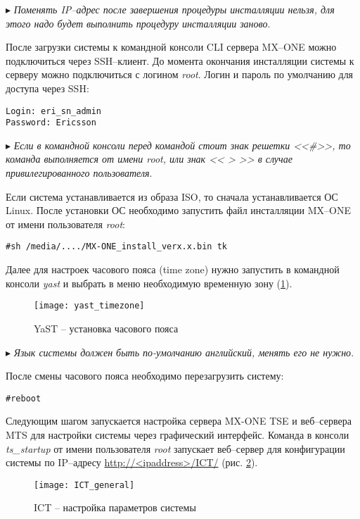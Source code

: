 $\blacktriangleright$ {\em Поменять IP--адрес после завершения процедуры инсталляции нельзя, для этого надо будет выполнить процедуру инсталляции заново}.

После загрузки системы к командной консоли CLI сервера MX--ONE можно подключиться через SSH--клиент. До момента окончания инсталляции системы к серверу можно подключиться с логином {\em root}. Логин и пароль по умолчанию для доступа через SSH:
\begin{lstlisting}
Login: eri_sn_admin
Password: Ericsson
\end{lstlisting}

$\blacktriangleright$ {\em Если в командной консоли перед командой стоит знак решетки <<\#>>, то команда выполняется от имени root, или знак << > >> в случае привилегированного пользователя}.

Если система устанавливается из образа ISO, то сначала устанавливается ОС Linux. После установки ОС необходимо запустить файл инсталляции MX--ONE от имени пользователя {\em root}:

\begin{lstlisting}
#sh /media/..../MX-ONE_install_verx.x.bin tk
\end{lstlisting}

Далее для настроек часового пояса (time zone) нужно запустить в командной консоли {\em yast} и выбрать в меню необходимую временную зону (\ref{img:yast_timezone}).
\begin{figure}[ht]
  \center
  \texttt{[image: yast\_timezone]}
  \caption{YaST -- установка часового пояса}
  \label{img:yast_timezone}
\end{figure}

$\blacktriangleright$ {\em Язык системы должен быть по-умолчанию английский, менять его не нужно}.

После смены часового пояса необходимо перезагрузить систему:
\begin{lstlisting}
#reboot
\end{lstlisting}
\clearpage

Следующим шагом запускается настройка сервера MX-ONE TSE и веб--сервера MTS для настройки системы через графический интерфейс.
Команда в консоли {\em ts\_startup} от имени пользователя {\em root} запускает веб--сервер для конфигурации системы по IP--адресу \url{http://<ipaddress>/ICT/} (рис. \ref{img:ICT_general}).

\begin{figure}[ht]
  \center
  \texttt{[image: ICT\_general]}
  \caption{ICT -- настройка параметров системы}
  \label{img:ICT_general}
\end{figure}

